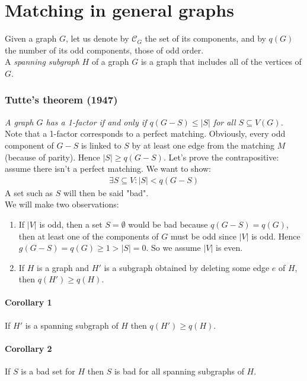 \documentclass[11pt]{book}
\begin{document}
	\section{Matching in general graphs}
		Given a graph $G$, let us denote by $\mathcal{C}_G$ the set of its components, and by $q(G)$ the number of its odd components, those of odd order.\\
		
		A \textit{spanning subgraph} $H$ of a graph $G$ is a graph that includes all of the vertices of $G$. 


		\subsubsection{Tutte's theorem (1947)} 
		
		\textit{A graph $G$ has a 1-factor if and only if $q(G - S) \leq |S|$ for all $S \subseteq V(G)$.}\\
		
		Note that a 1-factor corresponds to a perfect matching. Obviously, every odd component of $G - S$ is linked to $S$ by at least one edge from the matching $M$ (because of parity). Hence $|S| \geq q(G - S)$. Let's prove the contrapositive: assume there isn't a perfect matching. We want to show:
			\begin{eqnarray}
				\exists S \subseteq V : |S| < q(G - S)
			\end{eqnarray} 
			A set such as $S$ will then be said "bad".\\
		
		We will make two observations:
		\begin{enumerate}
			\item If $|V|$ is odd, then a set $S = \emptyset$ would be bad because $q(G - S) = q (G)$, then at least one of the components of $G$ must be odd since $|V|$ is odd. Hence $g(G -S) = q(G) \geq 1 > |S| = 0$. So we assume $|V|$ is even.
			\item If $H$ is a graph and $H'$ is a subgraph obtained by deleting some edge $e$ of $H$, then $q(H') \geq q(H)$.
		\end{enumerate}

		\paragraph{Corollary 1} If $H'$ is a spanning subgraph of $H$ then  $q(H') \geq q(H)$.
		
		\paragraph{Corollary 2} If $S$ is a bad set for $H$ then $S$ is bad for all spanning subgraphs of $H$.
		
\end{document}
